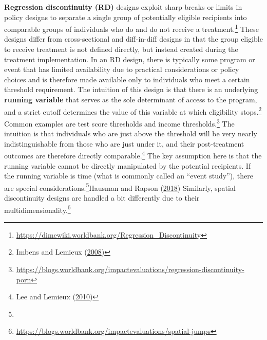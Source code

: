 \documentclass[
]{book}
\begin{document}
\textbf{Regression discontinuity (RD)} designs exploit sharp breaks or limits
in policy designs to separate a single group of potentially eligible recipients
into comparable groups of individuals who do and do not receive a treatment.\footnote{\url{https://dimewiki.worldbank.org/Regression_Discontinuity}}
These designs differ from cross-sectional and diff-in-diff designs
in that the group eligible to receive treatment is not defined directly,
but instead created during the treatment implementation.
In an RD design, there is typically some program or event
that has limited availability due to practical considerations or policy choices
and is therefore made available only to individuals who meet a certain threshold requirement.
The intuition of this design is that there is an underlying \textbf{running variable}
that serves as the sole determinant of access to the program,
and a strict cutoff determines the value of this variable at which eligibility stops.\footnote{Imbens and Lemieux (\protect\hyperlink{ref-imbens2008regression}{2008})}
Common examples are test score thresholds and income thresholds.\footnote{\url{https://blogs.worldbank.org/impactevaluations/regression-discontinuity-porn}}
The intuition is that individuals who are just above the threshold
will be very nearly indistinguishable from those who are just under it,
and their post-treatment outcomes are therefore directly comparable.\footnote{Lee and Lemieux (\protect\hyperlink{ref-lee2010regression}{2010})}
The key assumption here is that the running variable cannot be directly manipulated
by the potential recipients.
If the running variable is time (what is commonly called an ``event study''),
there are special considerations.\footnote{}Hausman and Rapson (\protect\hyperlink{ref-hausman2018regression}{2018})
Similarly, spatial discontinuity designs are handled a bit differently due to their multidimensionality.\footnote{\url{https://blogs.worldbank.org/impactevaluations/spatial-jumps}}
\end{document}

